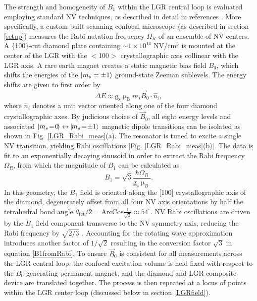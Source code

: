 The strength and homogeneity of $B_1$ within the LGR central loop is evaluated employing standard NV techniques, as described in detail in references \cite{pham2013magnetic,childressthesis2011coherent,mazethesis2010quantum}. More specifically, a custom built scanning confocal microscope (as described in section \ref{setup}) measures the Rabi nutation frequency $\Omega_R$ of an ensemble of NV centers. A $\{$100$\}$-cut diamond plate containing $\sim 1 \times 10^{14}$ NV/cm$^3$ is mounted at the center of the LGR with the $<$100$>$ crystallographic axis collinear with the LGR axis. A rare earth magnet creates a static magnetic bias field $B_0$, which shifts the energies of the $\ket{m_s=\pm1}$ ground-state Zeeman sublevels. The energy shifts are given to first order by~\cite{taylor2008high}
\begin{equation}
\Delta E \approx \text{g}_{\text{s}} \upmu_\text{B} m_s \vec{B}_0\cdot \hat{n}_i,
\end{equation}
where $\hat{n}_i$ denotes a unit vector oriented along one of the four diamond crystallographic axes. By judicious choice of $\vec{B}_0$, all eight energy levels and associated $\ket{m_s\!=\!0\!} \leftrightarrow \ket{\!m_s\! =\!\pm1}$ magnetic dipole transitions can be isolated as shown in Fig. \ref{LGR_Rabi_meas}(a). The resonator is tuned to excite a single NV transition, yielding Rabi oscillations [Fig. \ref{LGR_Rabi_meas}(b)]. The data is fit to an exponentially decaying sinusoid in order to extract the Rabi frequency $\Omega_R$, from which the magnitude of $B_1$ can be calculated as
\begin{equation}\label{B1fromRabi}
B_1 = \sqrt{3}\frac{\hbar \Omega_R}{\text{g}_{\text{s}} \upmu_{B}}.
\end{equation} 
In this geometry, the $B_1$ field is oriented along the [100] crystallographic axis of the diamond, degenerately offset from all four NV axis orientations by half the tetrahedral bond angle $\theta_{\text{tet}}/2 = \text{ArcCos}\frac{1}{\sqrt{3}} \approx 54^\circ$. NV Rabi oscillations are driven by the $B_1$ field component transverse to the NV symmetry axis, reducing the Rabi frequency by $\sqrt{2/3}$ \cite{sasaki2016broadband}. Accounting for the rotating wave approximation introduces another factor of $1/\sqrt{2}$ resulting in the conversion factor $\sqrt{3}$ in equation \ref{B1fromRabi}. To ensure $\vec{B}_0$ is consistent for all measurements across the LGR central loop, the confocal excitation volume is held fixed with respect to the $B_0$-generating permanent magnet, and the diamond and LGR composite device are translated together. The process is then repeated at a locus of points within the LGR center loop (discussed below in section \ref{LGRfield}).

